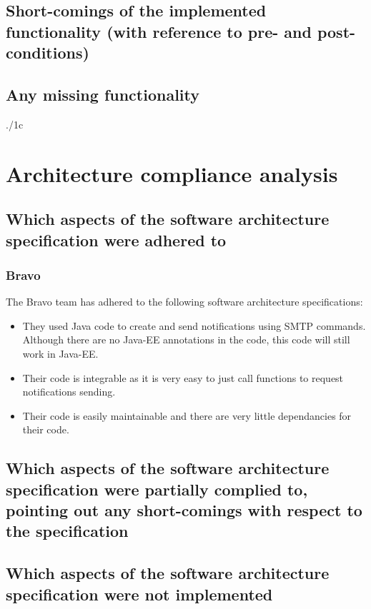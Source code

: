 \documentclass{article}
\begin{document}
\subsection{Short-comings of the implemented functionality (with reference to pre- and post-conditions)}


\subsection{Any missing functionality}
 {./1c}


\section{Architecture compliance analysis}
\subsection{Which aspects of the software architecture specification were adhered to}
\subsubsection{Bravo}
The Bravo team has adhered to the following software architecture specifications:
\begin{itemize}
	\item They used Java code to create and send notifications using SMTP commands. Although there are no Java-EE annotations in the code, this code will still work in Java-EE.
	\item Their code is integrable as it is very easy to just call functions to request notifications sending.
	\item Their code is easily maintainable and there are very little dependancies for their code.
\end{itemize}


\subsection{Which aspects of the software architecture specification were partially complied to, pointing out any short-comings with respect to the specification}


\subsection{Which aspects of the software architecture specification were not implemented}



\end{document}
